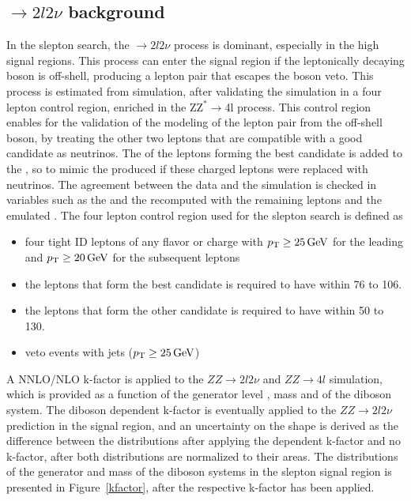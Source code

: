 \subsection*{\PZZ$\rightarrow2l2\nu$ background}
\noindent\justify
In the slepton search, the \PZZ$\rightarrow2l2\nu$ process is dominant, especially in the high \ptmiss signal regions.
This process can enter the signal region if the leptonically decaying \PZ boson is off-shell, producing a lepton pair that escapes the \PZ boson veto.
This process is estimated from simulation, after validating the simulation in a four lepton control region, enriched in the Z$\mathrm{Z^{*}}\rightarrow$4l process.
This control region enables for the validation of the modeling of the lepton pair from the off-shell \PZ boson, by treating the other two leptons that are compatible with a good \PZ candidate as neutrinos. 
The \pt of the leptons forming the best \PZ candidate is added to the \ptmiss, so to mimic the \ptmiss produced if these charged leptons were replaced with neutrinos.
The agreement between the data and the simulation is checked in variables such as the \ptmiss and the \mttwo recomputed with the remaining leptons and the emulated \ptmiss.
The four lepton control region used for the slepton search is defined as
\begin{itemize} 
    \item four tight ID leptons of any flavor or charge with $p_{\mathrm{T}}\geq25\,\text{Ge\hspace{-.08em}V}$ for the leading and $p_{\mathrm{T}}\geq20\,\text{Ge\hspace{-.08em}V}$ for the subsequent leptons
    \item the leptons that form the best \PZ candidate is required to have \mll within 76 to 106\GeV. 
    \item the leptons that form the other \PZ candidate is required to have \mll within 50 to 130\GeV.
    \item veto events with jets ($p_{\mathrm{T}}\geq25\,\text{Ge\hspace{-.08em}V}$) 
\end{itemize}    
\newpara                   
\noindent\justify
A NNLO/NLO k-factor is applied to the $ZZ\rightarrow 2l2\nu$ and $ZZ\rightarrow 4l$ simulation, which is provided as a function of the generator level \pt, mass and \dphi of the diboson system.
The diboson \pt dependent k-factor is eventually applied to the $ZZ\rightarrow 2l2\nu$  prediction in the signal region, and an uncertainty on the shape is derived as the difference between the distributions after applying the \pt dependent k-factor and no k-factor, after both distributions are normalized to their areas.
The distributions of the generator \pt and mass of the diboson systems in the slepton signal region is presented in Figure~\ref{kfactor}, after the respective k-factor has been applied.
